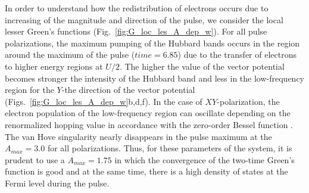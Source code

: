 In order to understand how the redistribution of electrons occurs due to increasing of the magnitude and direction of the pulse, we consider the local lesser Green's functions (Fig.~\ref{fig:G_loc_les_A_dep_w}). For all pulse polarizations, the maximum pumping of the Hubbard bands occurs in the region around the maximum of the pulse ($time=6.85$) due to the transfer of electrons to higher energy regions at $U/2$.
The higher the value of the vector potential becomes stronger the intensity of the Hubbard band and less in the low-frequency region for the $Y$-the direction of the vector potential (Figs.~\ref{fig:G_loc_les_A_dep_w}b,d,f). In the case of $XY$-polarization, the electron population of the low-frequency region can oscillate depending on the renormalized hopping value in accordance with the zero-order Bessel function \cite{PhysRevLett.106.236401}. The van Hove singularity nearly disappears in the pulse maximum at the $A_{max}=3.0$ for all polarizations.
Thus, for these parameters of the system, it is prudent to use a $A_{max}=1.75$ in which the convergence of the two-time Green's function is good and at the same time, there is a high density of states at the Fermi level during the pulse.
